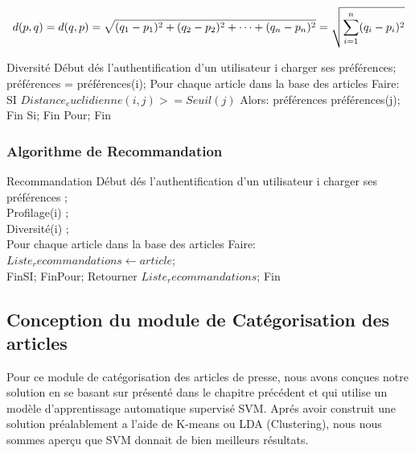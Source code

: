             \[d({p} ,{q})=d({q} ,{p})={\sqrt {(q_{1}-p_{1})^{2}+(q_{2}-p_{2})^{2}+\cdots +(q_{n}-p_{n})^{2}}}\\
            ={\sqrt {\sum _{i=1}^{n}(q_{i}-p_{i})^{2}}}\]
  
\begin{algorithm}
    
    \begin{algorithmic}[1]
        \STATE Diversité
        \STATE Début
        \STATE dés l'authentification d'un utilisateur i charger ses préférences;
        \STATE préférences = préférences(i);
        \STATE Pour chaque article dans la base des articles Faire:
        \STATE SI {$Distance_euclidienne(i,j) >= Seuil(j)$} Alors:
        \STATE préférences \gets préférences(j);
        \STATE Fin Si;  
        \STATE Fin Pour;
        \STATE Fin
    \end{algorithmic}
    
\end{algorithm}

\subsubsection{Algorithme de Recommandation}


\begin{algorithm}
    \begin{algorithmic}[1]
        \STATE Recommandation
        \STATE Début
        \STATE dés l'authentification d'un utilisateur i charger ses préférences ;\\
        \STATE Profilage(i) ;\\
        \STATE Diversité(i) ;\\
        \STATE Pour chaque article dans la base des articles Faire:
        $Liste_recommandations \gets article$;\\
        \STATE FinSI;
        \STATE FinPour;
        \STATE \quad Retourner $Liste_recommandations$;
        \STATE Fin
    \end{algorithmic}
\end{algorithm}


\subsection{Conception du module de Catégorisation des articles}
Pour ce module de catégorisation des articles de presse, nous avons conçues notre solution en se basant sur \cite{miusfbvimuab} présenté dans le chapitre précédent et qui utilise un modèle d'apprentissage automatique supervisé SVM. Aprés avoir construit une solution préalablement a l'aide de K-means ou LDA (Clustering), nous nous sommes aperçu que SVM donnait de bien meilleurs résultats.\\

